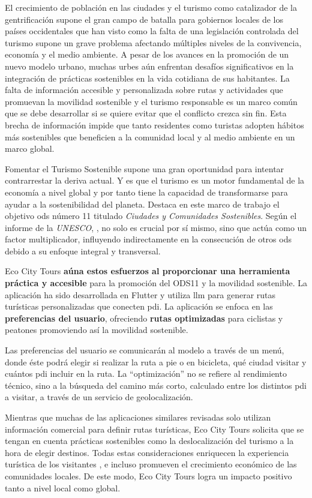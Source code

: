
El crecimiento de población en las ciudades \cite{nieuwenhuijsen_urban_2020} y el turismo como catalizador de la gentrificación supone el gran campo de batalla para gobiernos locales de los países occidentales que han visto como la falta de una legislación controlada del turismo supone un grave problema afectando múltiples niveles de la convivencia, economía y el medio ambiente. A pesar de los avances en la promoción de un nuevo modelo urbano, muchas urbes aún enfrentan desafíos significativos en la integración de prácticas sostenibles en la vida cotidiana de sus habitantes. La falta de información accesible y personalizada sobre rutas y actividades que promuevan la movilidad sostenible y el turismo responsable es un marco común que se debe desarrollar si se quiere evitar que el conflicto crezca sin fin. Esta brecha de información impide que tanto residentes como turistas adopten hábitos más sostenibles que beneficien a la comunidad local y al medio ambiente en un marco global.

Fomentar el Turismo Sostenible supone una gran oportunidad para intentar contrarrestar la deriva actual. Y es que el turismo es un motor fundamental de la economía a nivel global y por tanto tiene la capacidad de transformarse para ayudar a la sostenibilidad del planeta.  Destaca en este marco de trabajo el  objetivo \acrshort{ods} número 11 titulado \textit{Ciudades y Comunidades Sostenibles}. Según el informe de la \textit{UNESCO}, \cite{ionescu_progress_2024}, no solo es crucial por sí mismo, sino que actúa como un factor multiplicador, influyendo indirectamente en la consecución de otros \acrshort{ods} debido a su enfoque integral y transversal.

Eco City Tours \textbf{aúna estos esfuerzos al proporcionar una herramienta práctica y accesible} para la promoción del ODS11 y la movilidad sostenible. La aplicación ha sido desarrollada en Flutter y utiliza \acrfull{llm} para generar rutas turísticas personalizadas que conecten \acrlong{pdi}. La aplicación se enfoca en las \textbf{preferencias del usuario}, ofreciendo \textbf{rutas optimizadas} para ciclistas y peatones promoviendo así la movilidad sostenible.

Las preferencias del usuario se comunicarán al modelo a través de un menú, donde éste podrá elegir si realizar la ruta a pie o en bicicleta, qué ciudad visitar y cuántos \acrlong{pdi} incluir en la ruta. La ``optimización'' no se refiere al rendimiento técnico, sino a la búsqueda del camino más corto, calculado entre los distintos \acrshort{pdi} a visitar, a través de un servicio de geolocalización.

Mientras que muchas de las aplicaciones similares revisadas solo utilizan información comercial para definir rutas turísticas, Eco City Tours solicita que se tengan en cuenta prácticas sostenibles como la deslocalización del turismo a la hora de elegir destinos. Todas estas consideraciones enriquecen la experiencia turística de los visitantes \cite{mitas_tell_2023}, e incluso promueven el crecimiento económico de las comunidades locales. De este modo, Eco City Tours logra un impacto positivo tanto a nivel local como global.
